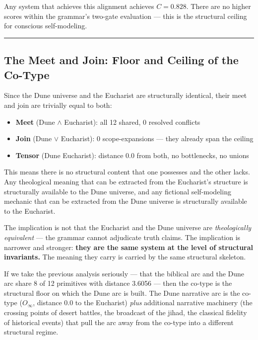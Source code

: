 \documentclass[12pt,a4paper]{article}
\begin{document}
Any system that achieves this alignment achieves $C = 0.828$. There are no higher scores within the grammar's two-gate evaluation --- this is the structural ceiling for conscious self-modeling.

\begin{center}
\rule{0.5\textwidth}{0.4pt}
\end{center}

\subsection{The Meet and Join: Floor and Ceiling of the Co-Type}

Since the Dune universe and the Eucharist are structurally identical, their meet and join are trivially equal to both:

\begin{itemize}
    \item \textbf{Meet} (Dune $\land$ Eucharist): all 12 shared, 0 resolved conflicts
    \item \textbf{Join} (Dune $\lor$ Eucharist): 0 scope-expansions --- they already span the ceiling
    \item \textbf{Tensor} (Dune \otimes Eucharist): distance 0.0 from both, no bottlenecks, no unions
\end{itemize}

This means there is no structural content that one possesses and the other lacks. Any theological meaning that can be extracted from the Eucharist's structure is structurally available to the Dune universe, and any fictional self-modeling mechanic that can be extracted from the Dune universe is structurally available to the Eucharist.

The implication is not that the Eucharist and the Dune universe are \emph{theologically equivalent} --- the grammar cannot adjudicate truth claims. The implication is narrower and stronger: \textbf{they are the same system at the level of structural invariants.} The meaning they carry is carried by the same structural skeleton.

If we take the previous analysis seriously --- that the biblical arc and the Dune arc share 8 of 12 primitives with distance 3.6056 --- then the co-type is the structural floor on which the Dune arc is built. The Dune narrative arc is the co-type ($O_{\infty}$, distance 0.0 to the Eucharist) \emph{plus} additional narrative machinery (the crossing points of desert battles, the broadcast of the jihad, the classical fidelity of historical events) that pull the arc away from the co-type into a different structural regime.
\end{document}
